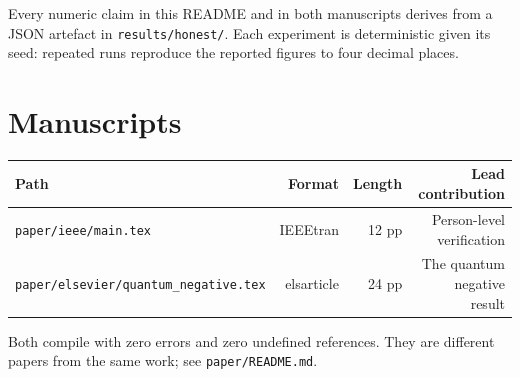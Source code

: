 \documentclass[11pt,a4paper]{article}
\begin{document}
Every numeric claim in this README and in both manuscripts derives from a JSON
artefact in \texttt{results/honest/}. Each experiment is deterministic given its seed:
repeated runs reproduce the reported figures to four decimal places.



\section*{Manuscripts}

\begin{center}
\small
\begin{tabular}{lrrr}
\toprule
Path & Format & Length & Lead contribution \\
\midrule
\texttt{paper/ieee/main.tex} & IEEEtran & 12 pp & Person-level verification \\
\texttt{paper/elsevier/quantum\_negative.tex} & elsarticle & 24 pp & The quantum negative result \\
\bottomrule
\end{tabular}
\end{center}


Both compile with zero errors and zero undefined references. They are different
papers from the same work; see \texttt{paper/README.md}.
\end{document}
